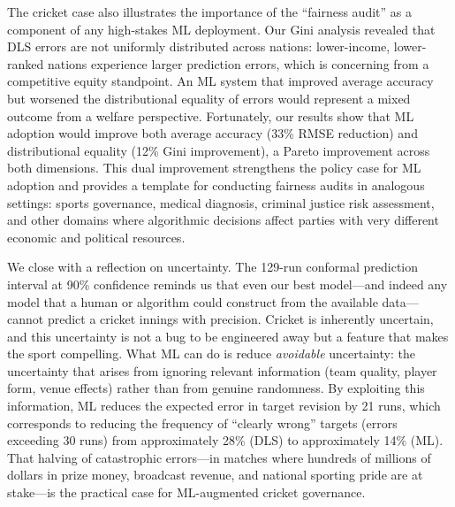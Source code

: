 \documentclass[10pt,a4paper,twocolumn]{article}
\begin{document}
The cricket case also illustrates the importance of the ``fairness audit'' as a component of any high-stakes ML deployment. Our Gini analysis revealed that DLS errors are not uniformly distributed across nations: lower-income, lower-ranked nations experience larger prediction errors, which is concerning from a competitive equity standpoint. An ML system that improved average accuracy but worsened the distributional equality of errors would represent a mixed outcome from a welfare perspective. Fortunately, our results show that ML adoption would improve both average accuracy (33\% RMSE reduction) and distributional equality (12\% Gini improvement), a Pareto improvement across both dimensions. This dual improvement strengthens the policy case for ML adoption and provides a template for conducting fairness audits in analogous settings: sports governance, medical diagnosis, criminal justice risk assessment, and other domains where algorithmic decisions affect parties with very different economic and political resources.

We close with a reflection on uncertainty. The 129-run conformal prediction interval at 90\% confidence reminds us that even our best model---and indeed any model that a human or algorithm could construct from the available data---cannot predict a cricket innings with precision. Cricket is inherently uncertain, and this uncertainty is not a bug to be engineered away but a feature that makes the sport compelling. What ML can do is reduce \emph{avoidable} uncertainty: the uncertainty that arises from ignoring relevant information (team quality, player form, venue effects) rather than from genuine randomness. By exploiting this information, ML reduces the expected error in target revision by 21 runs, which corresponds to reducing the frequency of ``clearly wrong'' targets (errors exceeding 30 runs) from approximately 28\% (DLS) to approximately 14\% (ML). That halving of catastrophic errors---in matches where hundreds of millions of dollars in prize money, broadcast revenue, and national sporting pride are at stake---is the practical case for ML-augmented cricket governance.
\end{document}

